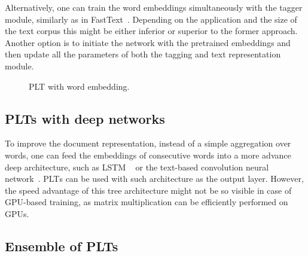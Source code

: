 \documentclass{article}
\newcommand{\Algo}[1]{\textsc{#1}}
\newcommand{\sectionBefore}{-0pt}
\newcommand{\sectionAfter}{-0pt}
\begin{document}
Alternatively, one can train the word embeddings simultaneously with the tagger module, similarly as in FastText~\citep{Joulin_et_al_2016}. Depending on the application and the size of the text corpus this might be either inferior or superior to the former approach. Another option is to initiate the network with the pretrained embeddings and then update all the parameters of both the tagging and text representation module. 

\begin{figure}
	\begin{center}
		
	\end{center}
	\caption{PLT with word embedding.}
	\label{pic:model-embedding}
\end{figure}



\vspace{\sectionBefore}
\subsection{PLTs with deep networks}
\label{sec:sparse_input}
\vspace{\sectionAfter}

To improve the document representation, instead of a simple aggregation over words, one can feed the embeddings of consecutive words into a more advance deep architecture, such as LSTM ~\citep{Hochreiter_Schmidhuber_1997} or the text-based convolution neural network~\cite{Liu_et_al_2017}. \Algo{PLT}s can be used with such architecture as the output layer. However, the speed advantage of this tree architecture might not be so visible in case of GPU-based training, as matrix multiplication can be efficiently performed on GPUs. 

\vspace{\sectionBefore}
\subsection{Ensemble of PLTs}
\label{sec:sparse_input}
\vspace{\sectionAfter}
\end{document}
